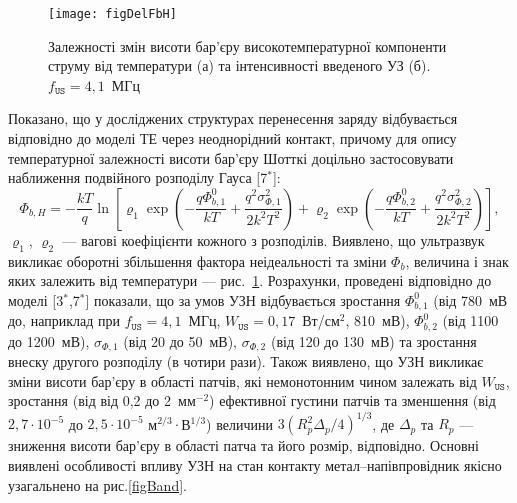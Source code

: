 \begin{figure}
\center
\texttt{[image: figDelFbH]}
\caption{\label{figDelFbH}
Залежності змін висоти бар'єру високотемпературної компоненти струму від температури (а) та інтенсивності введеного УЗ (б).
$f_\mathtt{US}=4,1$~МГц
}%
\end{figure}

Показано, що у досліджених структурах перенесення заряду відбувається відповідно до моделі ТЕ через неоднорідний контакт,
причому для опису температурної залежності висоти бар'єру Шотткі доцільно застосовувати наближення подвійного розподілу Гауса
[7$^*$]:
\begin{equation}
\label{eqDG}
  \Phi_{b,H}=-\frac{kT}{q}\ln\left[\varrho_1\exp\left(-\frac{q\Phi_{b,1}^0}{kT}+
  \frac{q^2\sigma^2_{\Phi,1}}{2k^2T^2}\right)
   +
  \varrho_2\exp\left(-\frac{q\Phi_{b,2}^{0}}{kT}+
  \frac{q^2\sigma^2_{\Phi,2}}{2k^2T^2}\right)\right],
\end{equation}
$\varrho_1$, $\varrho_2$  --- вагові коефіцієнти кожного з розподілів.
Виявлено, що ультразвук викликає оборотні збільшення фактора неідеальності та зміни $\Phi_{b}$,
величина і знак яких залежить від температури --- рис.~\ref{figDelFbH}.
Розрахунки, проведені відповідно до моделі
[3$^*$,7$^*$] показали, що за умов УЗН відбувається зростання
$\Phi_{b,1}^0$ (від 780~мВ до, наприклад при $f_\mathtt{US}=4,1$~МГц, $W_\mathtt{US}=0,17$~Вт/см$^2$,  810~мВ),
$\Phi_{b,2}^0$ (від 1100 до  1200~мВ),
$\sigma_{\Phi,1}$ (від 20 до  50~мВ),
$\sigma_{\Phi,2}$ (від 120 до  130~мВ) та
зростання внеску другого розподілу (в чотири рази).
Також виявлено,
що УЗН викликає зміни висоти бар'єру в області патчів, які немонотонним чином залежать від $W_\mathtt{US}$,
зростання (від від 0,2 до 2~мм$^{-2}$) ефективної густини патчів та зменшення (від $2,7\cdot10^{-5}$ до $2,5\cdot10^{-5}$ м$^{2/3}\cdot$В$^{1/3}$)
величини $3(R_p^2\Delta_p/4)^{1/3}$, де $\Delta_p$ та $R_p$ --- зниження висоти бар'єру в області патча та його розмір, відповідно.
Основні виявлені особливості впливу УЗН на стан контакту метал--напівпровідник якісно узагальнено на рис.\ref{figBand}.



